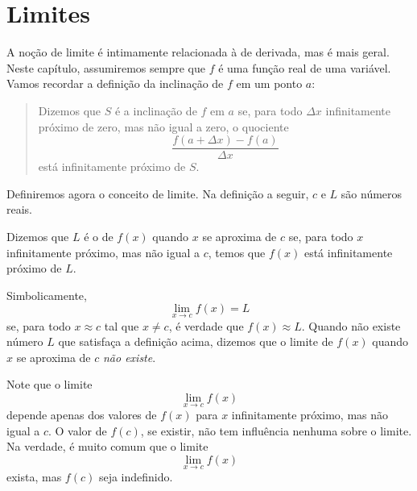 \begin{sectionproblems}



\end{sectionproblems}

\section{Limites}
\label{sec:limits}

A noção de limite é intimamente relacionada à de derivada, mas é mais
geral. Neste capítulo, assumiremos sempre que $f$ é uma função real
de uma variável. Vamos recordar a definição da inclinação de $f$ em um
ponto $a$:
\begin{quote}
Dizemos que $S$ é a inclinação de $f$ em $a$ se, para todo $\Delta x$
infinitamente próximo de zero, mas não igual a zero, o quociente
$$
  \frac{f(a + \Delta x) - f(a)}{\Delta x}
$$
está infinitamente próximo de $S$.
\end{quote}

Definiremos agora o conceito de limite. Na definição a seguir, $c$ e $L$
são números reais.

\begin{defin}
Dizemos que $L$ é o  de $f(x)$ quando $x$ se aproxima de $c$
se, para todo $x$ infinitamente próximo, mas não igual a $c$, temos que
$f(x)$ está infinitamente próximo de $L$.

Simbolicamente,
$$
  \lim_{x \to c} f(x) = L
$$
se, para todo $x \approx c$ tal que $x \ne c$, é verdade que
$f(x) \approx L$. Quando não existe número $L$ que satisfaça a definição
acima, dizemos que o limite de $f(x)$ quando $x$ se aproxima de $c$
\emph{não existe}.
\end{defin}

Note que o limite
$$
  \lim_{x \to c} f(x)
$$
depende apenas dos valores de $f(x)$ para $x$ infinitamente próximo, mas
não igual a $c$. O valor de $f(c)$, se existir, não tem influência nenhuma
sobre o limite. Na verdade, é muito comum que o limite
$$
  \lim_{x \to c} f(x)
$$
exista, mas $f(c)$ seja indefinido.

